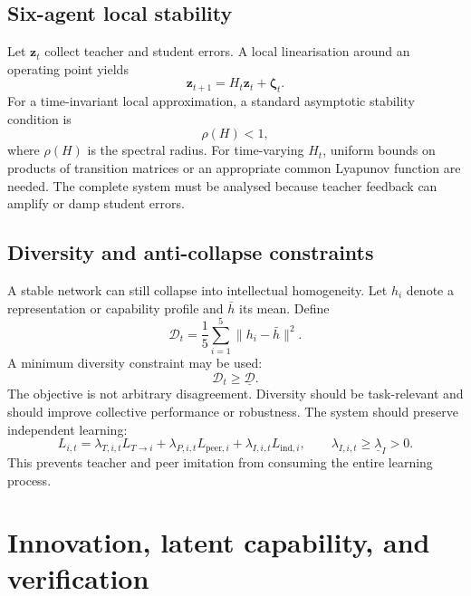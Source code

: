 \documentclass[11pt,a4paper]{article}
\begin{document}
\subsection{Six-agent local stability}

Let \(\mathbf z_t\) collect teacher and student errors. A local linearisation around an operating point yields
\begin{equation}
\mathbf z_{t+1}=H_t\mathbf z_t+\boldsymbol{\zeta}_t.
\end{equation}
For a time-invariant local approximation, a standard asymptotic stability condition is
\begin{equation}
\rho(H)<1,
\end{equation}
where \(\rho(H)\) is the spectral radius. For time-varying \(H_t\), uniform bounds on products of transition matrices or an appropriate common Lyapunov function are needed. The complete system must be analysed because teacher feedback can amplify or damp student errors.

\subsection{Diversity and anti-collapse constraints}

A stable network can still collapse into intellectual homogeneity. Let \(h_i\) denote a representation or capability profile and \(\bar h\) its mean. Define
\begin{equation}
\mathcal D_t
=
\frac{1}{5}\sum_{i=1}^{5}\|h_i-\bar h\|^2.
\end{equation}
A minimum diversity constraint may be used:
\begin{equation}
\mathcal D_t\geq\underline{\mathcal D}.
\end{equation}
The objective is not arbitrary disagreement. Diversity should be task-relevant and should improve collective performance or robustness. The system should preserve independent learning:
\begin{equation}
L_{i,t}
=
\lambda_{T,i,t}L_{T\rightarrow i}
+\lambda_{P,i,t}L_{\mathrm{peer},i}
+\lambda_{I,i,t}L_{\mathrm{ind},i},
\qquad
\lambda_{I,i,t}\geq\underline\lambda_I>0.
\end{equation}
This prevents teacher and peer imitation from consuming the entire learning process.

\section{Innovation, latent capability, and verification}
\end{document}
